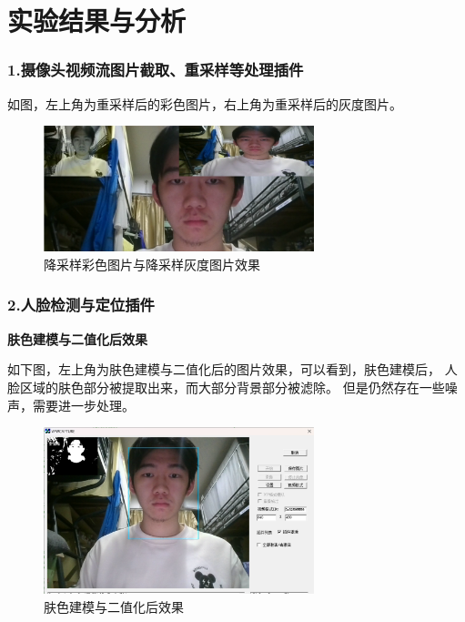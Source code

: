 \documentclass[12pt,hyperref,a4paper,UTF8]{ctexart}
\begin{document}
\newpage
\section{实验结果与分析}
        \subsubsection*{\large \textbf{1.摄像头视频流图片截取、重采样等处理插件}}

        如图，左上角为重采样后的彩色图片，右上角为重采样后的灰度图片。
    
        \begin{figure}[H]
            \centering
            \includegraphics[width=0.7\textwidth]{./figures/fig/image14.png}
            \caption{降采样彩色图片与降采样灰度图片效果}
            \label{fig:example}
        \end{figure}

        \subsubsection*{\large \textbf{2.人脸检测与定位插件}}
        \large \textbf{肤色建模与二值化后效果}

        如下图，左上角为肤色建模与二值化后的图片效果，可以看到，肤色建模后，
        人脸区域的肤色部分被提取出来，而大部分背景部分被滤除。
        但是仍然存在一些噪声，需要进一步处理。
        \begin{figure}[H]
            \centering
            \includegraphics[width=0.7\textwidth]{./figures/fig/image15.png}
            \caption{肤色建模与二值化后效果}
            \label{fig:example}
        \end{figure}
\end{document}
